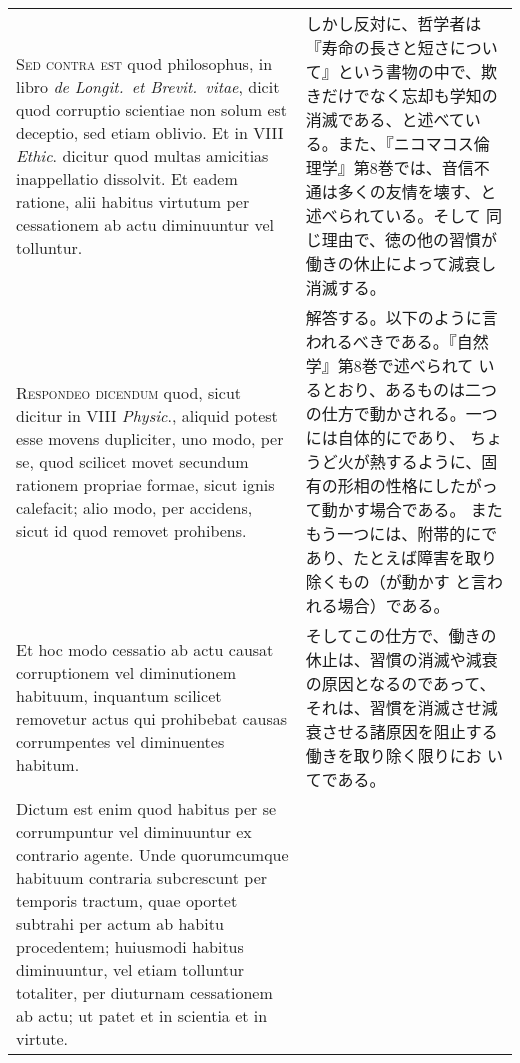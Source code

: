 \documentclass[10pt]{jsarticle} %
\begin{document}
\begin{longtable}{p{21em}p{21em}}
\\



{\scshape Sed contra est} quod philosophus, in libro {\itshape de
Longit.~et Brevit.~vitae}, dicit quod corruptio scientiae non solum
est deceptio, sed etiam oblivio. Et in VIII {\itshape Ethic}. dicitur
quod multas amicitias inappellatio dissolvit. Et eadem ratione, alii
habitus virtutum per cessationem ab actu diminuuntur vel tolluntur.

&

しかし反対に、哲学者は『寿命の長さと短さについて』という書物の中で、欺
きだけでなく忘却も学知の消滅である、と述べている。また、『ニコマコス倫
理学』第8巻では、音信不通は多くの友情を壊す、と述べられている。そして
同じ理由で、徳の他の習慣が働きの休止によって減衰し消滅する。

\\



{\scshape Respondeo dicendum} quod, sicut dicitur in VIII {\itshape
Physic}., aliquid potest esse movens dupliciter, uno modo, per se,
quod scilicet movet secundum rationem propriae formae, sicut ignis
calefacit; alio modo, per accidens, sicut id quod removet prohibens.


&

解答する。以下のように言われるべきである。『自然学』第8巻で述べられて
いるとおり、あるものは二つの仕方で動かされる。一つには自体的にであり、
ちょうど火が熱するように、固有の形相の性格にしたがって動かす場合である。
またもう一つには、附帯的にであり、たとえば障害を取り除くもの（が動かす
と言われる場合）である。


\\

Et hoc modo cessatio ab actu causat corruptionem vel diminutionem
habituum, inquantum scilicet removetur actus qui prohibebat causas
corrumpentes vel diminuentes habitum.


&


そしてこの仕方で、働きの休止は、習慣の消滅や減衰の原因となるのであって、
それは、習慣を消滅させ減衰させる諸原因を阻止する働きを取り除く限りにお
いてである。

\\


Dictum est enim quod habitus per se corrumpuntur vel diminuuntur ex
contrario agente. Unde quorumcumque habituum contraria subcrescunt per
temporis tractum, quae oportet subtrahi per actum ab habitu
procedentem; huiusmodi habitus diminuuntur, vel etiam tolluntur
totaliter, per diuturnam cessationem ab actu; ut patet et in scientia
et in virtute.



\end{longtable}
\end{document}
